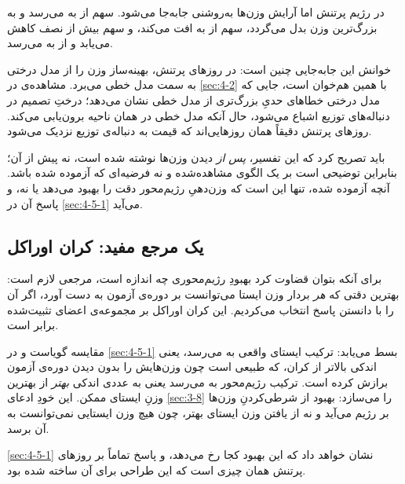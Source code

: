 در رژیم پرتنش اما آرایش وزن‌ها به‌روشنی جابه‌جا می‌شود. سهم  از
 به  می‌رسد و به بزرگ‌ترین وزن بدل می‌گردد، سهم  از
 به  افت می‌کند، و سهم  بیش از نصف کاهش می‌یابد و از
 به  می‌رسد.

خوانش این جابه‌جایی چنین است: در روزهای پرتنش، بهینه‌ساز وزن را از مدل درختی به سمت
مدل خطی می‌برد. مشاهده‌ی  در \cref{sec:4-2} با همین هم‌خوان است، جایی که مدل درختی
خطاهای حدیِ بزرگ‌تری از مدل خطی نشان می‌دهد؛ درختِ تصمیم در دنباله‌های توزیع اشباع
می‌شود، حال آنکه مدل خطی در همان ناحیه برون‌یابی می‌کند. روزهای پرتنش دقیقاً همان
روزهایی‌اند که قیمت به دنباله‌ی توزیع نزدیک می‌شود.

باید تصریح کرد که این تفسیر، \emph{پس از} دیدن وزن‌ها نوشته شده است، نه پیش از آن؛
بنابراین توضیحی است بر یک الگوی مشاهده‌شده و نه فرضیه‌ای که آزموده شده باشد. آنچه
آزموده شده، تنها این است که وزن‌دهیِ رژیم‌محور دقت را بهبود می‌دهد یا نه، و پاسخ آن در
\cref{sec:4-5-1} می‌آید.

\subsection*{یک مرجع مفید: کران اوراکل}

برای آنکه بتوان قضاوت کرد بهبودِ رژیم‌محوری چه اندازه است، مرجعی لازم است: بهترین
دقتی که \emph{هر} بردار وزن ایستا می‌توانست بر دوره‌ی آزمون به دست آورد، اگر آن را با
دانستن پاسخ انتخاب می‌کردیم. این کران اوراکل بر مجموعه‌ی اعضای تثبیت‌شده برابر
 است.

مقایسه گویاست و در \cref{sec:4-5-1} بسط می‌یابد: ترکیب ایستای واقعی به 
می‌رسد، یعنی اندکی بالاتر از کران، که طبیعی است چون وزن‌هایش را بدون دیدن دوره‌ی
آزمون برازش کرده است. ترکیب رژیم‌محور به  می‌رسد  یعنی به عددی
اندکی \emph{بهتر} از بهترین وزنِ ایستای ممکن. این خودِ ادعای \cref{sec:3-8} را می‌سازد:
بهبود از شرطی‌کردنِ وزن‌ها بر رژیم می‌آید و نه از یافتن وزن ایستای بهتر، چون هیچ وزن
ایستایی نمی‌توانست به آن برسد.

\cref{sec:4-5-1} نشان خواهد داد که این بهبود کجا رخ می‌دهد، و پاسخ  تماماً بر روزهای
پرتنش  همان چیزی است که این طراحی برای آن ساخته شده بود.
